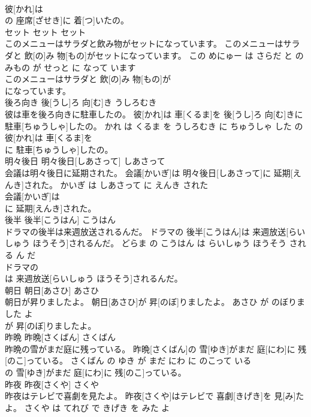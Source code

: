 \documentclass[8pt]{extreport}
\begin{document}
\begin{CJK}{UTF8}{min}
\\	彼[かれ]は
\\	の 座席[ざせき]に 着[つ]いたの。			
\\	セット	セット	セット	
\\	このメニューはサラダと飲み物がセットになっています。	このメニューはサラダと 飲[の]み 物[もの]がセットになっています。	この めにゅー は さらだ と のみもの が せっと に なって います	
\\	このメニューはサラダと 飲[の]み 物[もの]が
\\	になっています。			
\\	後ろ向き	後[うし]ろ 向[む]き	うしろむき	
\\	彼は車を後ろ向きに駐車したの。	彼[かれ]は 車[くるま]を 後[うし]ろ 向[む]きに 駐車[ちゅうしゃ]したの。	かれ は くるま を うしろむき に ちゅうしゃ した の	
\\	彼[かれ]は 車[くるま]を
\\	に 駐車[ちゅうしゃ]したの。			
\\	明々後日	明々後日[しあさって]	しあさって	
\\	会議は明々後日に延期された。	会議[かいぎ]は 明々後日[しあさって]に 延期[えんき]された。	かいぎ は しあさって に えんき された	
\\	会議[かいぎ]は
\\	に 延期[えんき]された。			
\\	後半	後半[こうはん]	こうはん	
\\	ドラマの後半は来週放送されるんだ。	ドラマの 後半[こうはん]は 来週放送[らいしゅう ほうそう]されるんだ。	どらま の こうはん は らいしゅう ほうそう される ん だ	
\\	ドラマの
\\	は 来週放送[らいしゅう ほうそう]されるんだ。			
\\	朝日	朝日[あさひ]	あさひ	
\\	朝日が昇りましたよ。	朝日[あさひ]が 昇[のぼ]りましたよ。	あさひ が のぼりました よ	
\\	が 昇[のぼ]りましたよ。			
\\	昨晩	昨晩[さくばん]	さくばん	
\\	昨晩の雪がまだ庭に残っている。	昨晩[さくばん]の 雪[ゆき]がまだ 庭[にわ]に 残[のこ]っている。	さくばん の ゆき が まだ にわ に のこって いる	
\\	の 雪[ゆき]がまだ 庭[にわ]に 残[のこ]っている。			
\\	昨夜	昨夜[さくや]	さくや	
\\	昨夜はテレビで喜劇を見たよ。	昨夜[さくや]はテレビで 喜劇[きげき]を 見[み]たよ。	さくや は てれび で きげき を みた よ	

\end{CJK}
\end{document}
